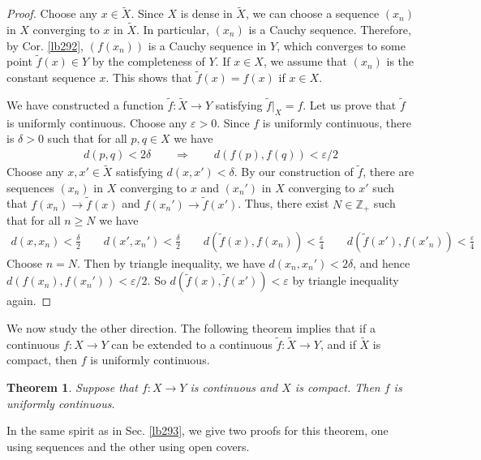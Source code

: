 \documentclass[12pt,b5paper,notitlepage]{article}
\theoremstyle{definition}
\theoremstyle{plain}
\newtheorem{thm}[df]{Theorem}
\newcommand{\wtd}{\widetilde}
\newcommand{\Zbb}{\mathbb Z}
\newcommand{\eps}{\varepsilon}
\numberwithin{equation}{section}
\begin{document}
\begin{proof}
Choose any $x\in\wtd X$. Since $X$ is dense in $\wtd X$, we can choose a sequence $(x_n)$ in $X$ converging to $x$ in $\wtd X$. In particular, $(x_n)$ is a Cauchy sequence. Therefore, by Cor. \ref{lb292}, $(f(x_n))$ is a Cauchy sequence in $Y$, which converges to some point $\wtd f(x)\in Y$ by the completeness of $Y$. If $x\in X$, we assume that $(x_n)$ is the constant sequence $x$. This shows that $\wtd f(x)=f(x)$ if $x\in X$.

We have constructed a function $\wtd f:\wtd X\rightarrow Y$ satisfying $\wtd f|_X=f$. Let us prove that $\wtd f$ is uniformly continuous. Choose any $\eps>0$. Since $f$ is uniformly continuous, there is $\delta>0$ such that for all $p,q\in X$ we have
\begin{align*}
d(p,q)<2\delta\qquad\Longrightarrow\qquad d(f(p),f(q))<\eps/2
\end{align*}
Choose any $x,x'\in \wtd X$ satisfying $d(x,x')<\delta$. By our construction of $\wtd f$, there are sequences $(x_n)$ in $X$ converging to $x$ and $(x_n')$ in $X$ converging to $x'$ such that $f(x_n)\rightarrow \wtd f(x)$ and $f(x_n')\rightarrow\wtd f(x')$. Thus, there exist $N\in\Zbb_+$ such that for all $n\geq N$ we have
\begin{align*}
d(x,x_n)<\frac\delta 2\qquad d(x',x_n')<\frac\delta 2\qquad d(\wtd f(x),f(x_n))<\frac\eps 4\qquad d(\wtd f(x'),f(x'_n))<\frac\eps 4
\end{align*}
Choose $n=N$. Then by triangle inequality, we have $d(x_n,x_n')<2\delta$, and hence $d(f(x_n),f(x_n'))<\eps/2$. So $d(\wtd f(x),\wtd f(x'))<\eps$ by triangle inequality again.
\end{proof}






We now study the other direction. The following theorem implies that if a continuous $f:X\rightarrow Y$ can be extended to a continuous $\wtd f:\wtd X\rightarrow Y$, and if $\wtd X$ is compact, then $f$ is uniformly continuous.


\begin{thm}\label{lb294}
Suppose that $f:X\rightarrow Y$ is continuous and $X$ is compact. Then $f$ is uniformly continuous.
\end{thm}

In the same spirit as in Sec. \ref{lb293}, we give two proofs for this theorem, one using sequences and the other using open covers.
\end{document}
